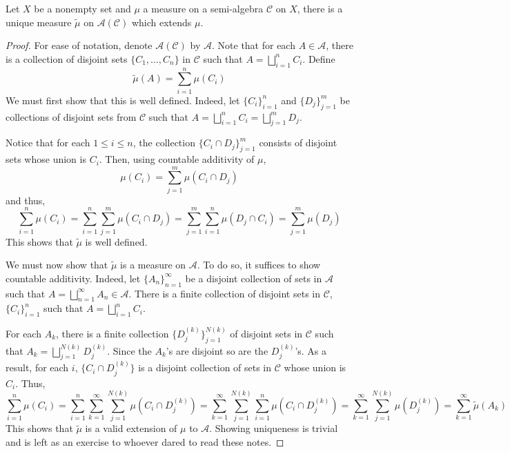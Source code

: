 \begin{theorem}
    Let $X$ be a nonempty set and $\mu$ a measure on a semi-algebra $\mathscr C$ on $X$, there is a unique measure $\widetilde\mu$ on $\mathcal A(\mathscr C)$ which extends $\mu$.
\end{theorem}
\begin{proof}
    For ease of notation, denote $\mathcal A(\mathscr C)$ by $\mathcal A$. Note that for each $A\in\mathcal A$, there is a collection of disjoint sets $\{C_1,\ldots,C_n\}$ in $\mathcal C$ such that $A = \bigsqcup\limits_{i = 1}^n C_i$. Define 
    \begin{equation*}
        \widetilde\mu(A) = \sum_{i = 1}^n\mu(C_i)
    \end{equation*}
    We must first show that this is well defined. Indeed, let $\{C_i\}_{i = 1}^n$ and $\{D_j\}_{j = 1}^m$ be collections of disjoint sets from $\mathscr C$ such that $A = \bigsqcup\limits_{i = 1}^n C_i = \bigsqcup\limits_{j = 1}^m D_j$. 

    Notice that for each $1\le i\le n$, the collection $\{C_i\cap D_j\}_{j = 1}^m$ consists of disjoint sets whose union is $C_i$. Then, using countable additivity of $\mu$, 
    \begin{equation*}
        \mu(C_i) = \sum_{j = 1}^m\mu(C_i\cap D_j)
    \end{equation*}
    and thus,
    \begin{equation*}
        \sum_{i = 1}^n\mu(C_i) = \sum_{i = 1}^n\sum_{j = 1}^m\mu(C_i\cap D_j) = \sum_{j = 1}^m\sum_{i = 1}^n\mu(D_j\cap C_i) = \sum_{j = 1}^m\mu(D_j)
    \end{equation*}
    This shows that $\widetilde\mu$ is well defined. 

    We must now show that $\widetilde\mu$ is a measure on $\mathcal A$. To do so, it suffices to show countable additivity. Indeed, let $\{A_n\}_{n = 1}^\infty$ be a disjoint collection of sets in $\mathcal A$ such that $A = \bigsqcup\limits_{n = 1}^\infty A_n\in\mathcal A$. There is a finite collection of disjoint sets in $\mathscr C$, $\{C_i\}_{i = 1}^n$ such that $A = \bigsqcup\limits_{i = 1}^n C_i$.

    For each $A_k$, there is a finite collection $\{D_j^{(k)}\}_{j = 1}^{N(k)}$ of disjoint sets in $\mathscr C$ such that $A_k = \bigsqcup_{j = 1}^{N(k)}D_j^{(k)}$. Since the $A_k$'s are disjoint so are the $D_j^{(k)}$'s. As a result, for each $i$, $\{C_i\cap D_j^{(k)}\}$ is a disjoint collection of sets in $\mathscr C$ whose union is $C_i$. Thus,
    \begin{equation*}
        \sum_{i = 1}^n \mu(C_i) = \sum_{i = 1}^n\sum_{k = 1}^\infty\sum_{j = 1}^{N(k)}\mu(C_i\cap D_j^{(k)}) = \sum_{k = 1}^{\infty}\sum_{j = 1}^{N(k)}\sum_{i = 1}^n\mu(C_i\cap D_j^{(k)}) = \sum_{k = 1}^\infty\sum_{j = 1}^{N(k)}\mu(D_j^{(k)}) = \sum_{k = 1}^\infty\widetilde\mu(A_k)
    \end{equation*}
    This shows that $\widetilde\mu$ is a valid extension of $\mu$ to $\mathcal A$. Showing uniqueness is trivial and is left as an exercise to whoever dared to read these notes.
\end{proof}

